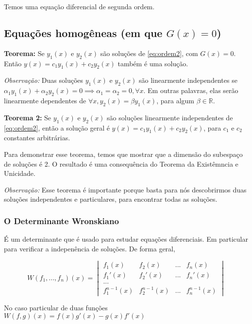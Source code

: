 \documentclass[12pt]{article}
\begin{document}
Temos uma equação diferencial de segunda ordem.

\subsection{Equações homogêneas (em que $G(x) = 0$)}

\textbf{Teorema:} Se $y_1(x)$ e $y_2(x)$ são soluções de \ref{eq:ordem2}, com
$G(x) = 0$. Então $y(x) = c_1y_1(x) + c_2y_2(x)$ também é uma solução. 

\textit{Observação:} Duas soluções $y_1(x)$ e $y_2(x)$ são linearmente
independentes se $\alpha_1y_1(x) + \alpha_2y_2(x) = 0 \implies \alpha_1 =
\alpha_2 = 0, \forall x$. Em outras palavras, elas serão linearmente
dependentes de $\forall x, y_2(x) = \beta y_1(x)$, para algum $\beta \in
\mathbb{R}$.  

\textbf{Teorema 2:} Se $y_1(x)$ e $y_2(x)$ são soluções linearmente
independentes de \ref{eq:ordem2}, então a solução geral é $y(x) = c_1y_1(x) +
c_2y_2(x)$, para $c_1$ e $c_2$ constantes arbitrárias. 

Para demonstrar esse teorema, temos que mostrar que a dimensão do subespaço de
soluções é 2. O resultado é uma consequência do Teorema da Existêmncia e
Unicidade. 

\textit{Observação:} Esse teorema é importante porque basta para nós
descobrirmos duas soluções independentes e particulares, para encontrar todas
as soluções. 

\subsubsection{O Determinante Wronskiano}

É um determinante que é usado para estudar equações diferenciais. Em
particular para verificar a indepenência de soluções. De forma geral, 

\begin{equation}
    W(f_1, ..., f_n)(x) = 
    \begin{vmatrix}
        f_1(x) & f_2(x) & ... & f_n(x) \\
        f_1'(x) & f_2'(x) & ... & f_n'(x) \\
        ... \\
        f_1^{n-1}(x) & f_2^{n-1}(x) & ... & f_n^{n-1}(x)
    \end{vmatrix}
\end{equation}

No caso particular de duas funções $W(f,g)(x) = f(x)g'(x) - g(x)f'(x)$
\end{document}
